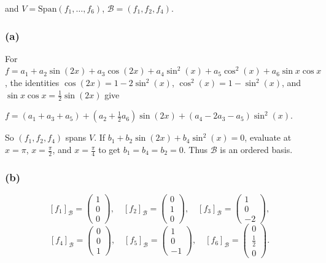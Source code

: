 and \(V = \text{Span}\left( {f_{1},\ldots,f_{6}} \right)\), \(\mathcal{B} = \left( {f_{1},f_{2},f_{4}} \right)\).

\subsubsection{(a)}

For \(f = a_{1} + a_{2}\sin\left( {2x} \right) + a_{3}\cos\left( {2x} \right) + a_{4}\sin^{2}(x) + a_{5}\cos^{2}(x) + a_{6}\sin x\cos x\), the identities \(\cos\left( {2x} \right) = 1 - 2\sin^{2}(x)\), \(\cos^{2}(x) = 1 - \sin^{2}(x)\), and \(\sin x\cos x = \frac{1}{2}\sin\left( {2x} \right)\) give

\(f = \left( {a_{1} + a_{3} + a_{5}} \right) + \left( {a_{2} + \frac{1}{2}a_{6}} \right)\sin\left( {2x} \right) + \left( {a_{4} - 2a_{3} - a_{5}} \right)\sin^{2}(x).\)

So \(\left( {f_{1},f_{2},f_{4}} \right)\) spans \(V\). If \(b_{1} + b_{2}\sin\left( {2x} \right) + b_{4}\sin^{2}(x) = 0\), evaluate at \(x = \pi\), \(x = \frac{\pi}{2}\), and \(x = \frac{\pi}{4}\) to get \(b_{1} = b_{4} = b_{2} = 0\). Thus \(\mathcal{B}\) is an ordered basis.

\subsubsection{(b)}

\[\left\lbrack f_{1} \right\rbrack_{\mathcal{B}} = \begin{pmatrix}
1 \\
0 \\
0
\end{pmatrix},\quad\left\lbrack f_{2} \right\rbrack_{\mathcal{B}} = \begin{pmatrix}
0 \\
1 \\
0
\end{pmatrix},\quad\left\lbrack f_{3} \right\rbrack_{\mathcal{B}} = \begin{pmatrix}
1 \\
0 \\
{- 2}
\end{pmatrix},\]\[\left\lbrack f_{4} \right\rbrack_{\mathcal{B}} = \begin{pmatrix}
0 \\
0 \\
1
\end{pmatrix},\quad\left\lbrack f_{5} \right\rbrack_{\mathcal{B}} = \begin{pmatrix}
1 \\
0 \\
{- 1}
\end{pmatrix},\quad\left\lbrack f_{6} \right\rbrack_{\mathcal{B}} = \begin{pmatrix}
0 \\
\frac{1}{2} \\
0
\end{pmatrix}.\]

